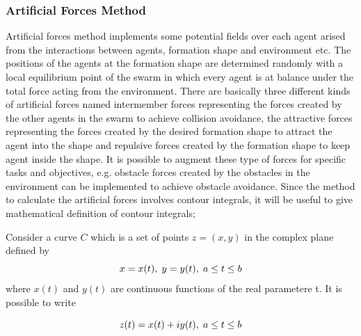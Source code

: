\documentclass[twoside]{article}
\begin{document}
		\subsubsection{Artificial Forces Method}
		Artificial forces method implements some potential fields over each agent arised from the interactions between agents, formation shape and environment etc. The positions of the agents at the formation shape  are determined randomly with a local equilibrium point of the swarm in which every agent is at balance under the total force acting from the environment. There are basically three different kinds of artificial forces named intermember forces representing the forces created by the other agents in the swarm to achieve collision avoidance, the attractive forces representing the forces created by the desired formation shape to attract the agent into the shape and repulsive forces created by the formation shape to keep agent inside the shape. It is possible to augment these type of forces for specific tasks and objectives, e.g. obstacle forces created by the obstacles in the environment can be implemented to achieve obstacle avoidance.
		Since the method to calculate the artificial forces involves contour integrals, it will be useful to give mathematical definition of contour integrals;
		
		Consider a curve $C$ which is a set of points $z = (x,y)$ in the complex plane defined by
		\begin{equation}
x = x(t),   \hspace{0.1cm} y = y(t),  \hspace{0.1cm} a\leq t \leq b
		\end{equation}
		where $x(t)$ and $y(t)$ are continuous functions of the real parametere t.  It is possible to write
		
		\begin{equation}
z(t) = x(t)+iy(t),   \hspace{0.1cm} a\leq t \leq b
		\end{equation}
		
\end{document}
